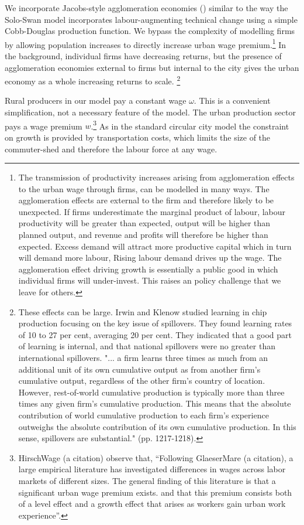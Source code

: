 We  incorporate Jacobs-style agglomeration economies (\cite{Beaudry:2009ua, Panne:2004vb, JacobsEofC})  similar to the way the  Solo-Swan model incorporates  labour-augmenting technical change using a simple Cobb-Douglas production function.  We bypass the complexity of modelling firms  by allowing population increases  to directly increase urban wage premium.\footnote{The transmission of productivity increases arising from agglomeration effects  to the urban wage through firms, can be modelled in many ways. The agglomeration effects are external to the firm and therefore likely to be unexpected. If  firms underestimate the marginal product of labour, labour productivity will be greater than expected, output will be higher than planned output, and revenue and profits will therefore be higher than expected. Excess demand will attract more productive capital which in turn will demand more labour,  Rising labour demand drives up the wage. The agglomeration effect driving growth is essentially a public good in which individual firms will under-invest. This raises an policy challenge that we leave for others.} %
In the background, individual firms have decreasing returns, but the presence of agglomeration economies external to firms but internal to the city gives the urban economy as a whole increasing returns to scale. \footnote{These effects can be large. Irwin and Klenow  studied learning in chip production focusing  on the key issue of spillovers. They found learning rates of 10 to 27 per cent, averaging 20 per cent. They indicated that a good part of learning is internal, and that national spillovers were no greater than international spillovers. "... a firm learns three times as much from an additional unit of its own cumulative output as from another firm's cumulative output, regardless of the other firm's country of location. However, rest-of-world cumulative production is typically more than three times any given firm's cumulative production. This means that the absolute contribution of world cumulative production to each firm's experience outweighs the absolute contribution of its own cumulative production. In this sense, spillovers are substantial." (pp. 1217-1218).} 


Rural producers in our model pay a constant wage $\omega$. This is a convenient simplification, not a necessary feature of the model. The urban production sector pays a wage premium $w$.\footnote{
HirschWage (a citation) observe that, ``Following GlaeserMare (a citation),  a  large  empirical  literature  has  investigated differences in wages across labor markets of different sizes. The general finding of this literature is that a significant urban wage premium exists. and that this premium consists both of a level effect and a growth effect that arises as workers gain urban work experience''. } As in the standard circular city model the constraint on growth is provided by transportation costs, which limits the size of the commuter-shed and therefore the labour force at any wage. 



